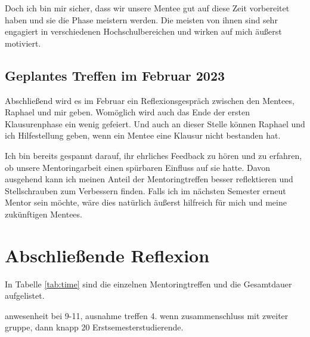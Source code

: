 \documentclass[
    paper=a4,
    div=calc,
    numbers=noendperiod,
    twocolumn,
]{scrartcl}
\begin{document}
        Doch ich bin mir sicher, dass wir unsere Mentee gut auf diese Zeit vorbereitet haben und sie die Phase meistern werden. Die meisten von ihnen sind sehr engagiert in verschiedenen Hochschulbereichen und wirken auf mich äußerst motiviert. 

    \subsection{Geplantes Treffen im Februar 2023}
        Abschließend wird es im Februar ein Reflexionsgespräch zwischen den Mentees, Raphael und mir geben. Womöglich wird auch das Ende der ersten Klausurenphase ein wenig gefeiert. Und auch an dieser Stelle können Raphael und ich Hilfestellung geben, wenn ein Mentee eine Klausur nicht bestanden hat. 
        
        Ich bin bereits gespannt darauf, ihr ehrliches Feedback zu hören und zu erfahren, ob unsere Mentoringarbeit einen spürbaren Einfluss auf sie hatte. Davon ausgehend kann ich meinen Anteil der Mentoringtreffen besser reflektieren und Stellschrauben zum Verbessern finden. Falls ich im nächsten Semester erneut Mentor sein möchte, wäre dies natürlich äußerst hilfreich für mich und meine zukünftigen Mentees. 
        
\section{Abschließende Reflexion}

    In Tabelle \ref{tab:time} sind die einzelnen Mentoringtreffen und die Gesamtdauer aufgelistet. 
    

    anwesenheit bei 9-11, ausnahme treffen 4. wenn zusammenschluss mit zweiter gruppe, dann knapp 20 Erstsemesterstudierende.
\end{document}
